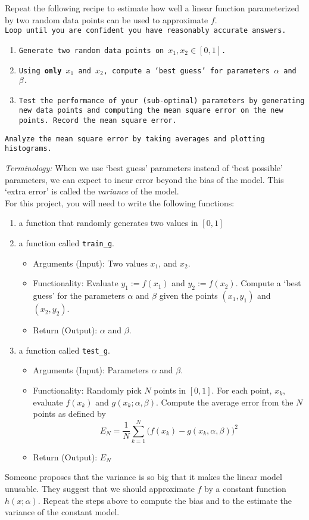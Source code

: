 Repeat the following recipe to estimate how well a linear function parameterized by two random data points can be used to approximate $f$.\\
\texttt{Loop until you are confident you have reasonably accurate answers.}
\begin{enumerate}\setlength{\itemsep}{0pt}
    \item \texttt{Generate two random data points on $x_1, x_2 \in [0,1]$.}
    \item \texttt{Using \textbf{only} $x_1$ and $x_2$, compute a `best guess' for parameters $\alpha$ and $\beta$.}
    \item \texttt{Test the performance of your (sub-optimal) parameters by generating new data points and computing the mean square error on the new points. Record the mean square error.}
\end{enumerate}
\texttt{Analyze the mean square error by taking averages and plotting histograms.}

\noindent\textit{Terminology:} When we use `best guess' parameters instead of `best possible' parameters, we can expect to incur error beyond the bias of the model. This `extra error' is called the \textit{variance} of the model.  \\
\vspace*{1cm}	
\noindent For this project, you will need to write the following functions:
\begin{enumerate}
    \item a function that randomly generates two values in $[0,1]$
    \item a function called \texttt{train\_g}.
    \begin{itemize}
        \item Arguments (Input): Two values $x_1$, and $x_2$.
        \item Functionality: Evaluate $y_1:=f(x_1)$ and $y_2:= f(x_2)$. Compute a `best guess' for the parameters $ \alpha$ and $ \beta$ given the points $(x_1,y_1)$ and $(x_2,y_2)$.
        \item Return (Output): $ \alpha$ and $ \beta$.
    \end{itemize}
    \item a function called \texttt{test\_g}.
    \begin{itemize}
        \item Arguments (Input): Parameters $ \alpha$ and $ \beta$.
        \item Functionality: Randomly pick $N$ points in $[0,1]$. For each point, $x_k$, evaluate $f(x_k)$ and $g(x_k;  \alpha,  \beta)$. Compute the average error from the $N$ points as defined by $$E_N = \frac{1}{N}\sum_{k = 1}^N \Big(f(x_k) - g(x_k, \alpha, \beta)\Big)^2$$
        \item Return (Output): $E_N$   
    \end{itemize}
\end{enumerate}

Someone proposes that the variance is so big that it makes the linear model unusable.  They suggest that we should approximate $f$ by a constant function  $h(x;\alpha)$. Repeat the steps above to compute the bias and to the estimate the variance of the constant model. 
